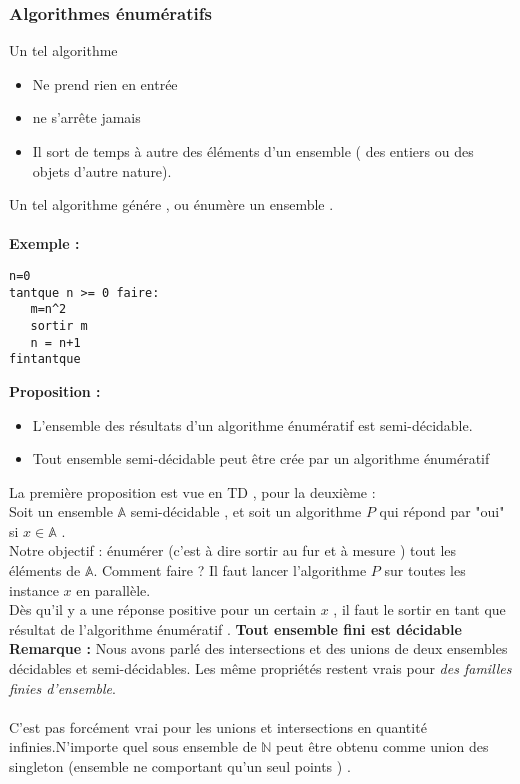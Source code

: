 \documentclass[base.tex]{subfiles}
\begin{document}
\subsubsection{Algorithmes énumératifs }%
Un tel algorithme
\begin{itemize}
\item Ne prend rien en entrée
\item ne s'arrête jamais
\item Il sort de temps à autre des éléments d'un ensemble ( des entiers ou des objets d'autre nature).
\end{itemize}
\medskip
Un tel algorithme génére , ou énumère un ensemble .
\\
\\
\textbf{Exemple :} 
\begin{verbatim}
n=0
tantque n >= 0 faire:
   m=n^2
   sortir m
   n = n+1
fintantque
\end{verbatim}
\medskip
\textbf{Proposition :}
\begin{itemize}
\item L'ensemble des résultats d'un algorithme énumératif est semi-décidable.
\item Tout ensemble semi-décidable peut être crée par un algorithme énumératif
\end{itemize}
\medskip
La première proposition est vue en TD , pour la deuxième :\\
Soit un ensemble $\mathbb{A}$ semi-décidable , et soit un algorithme $P$ qui répond par "oui" si $x \in \mathbb{A}$ .\\
Notre objectif : énumérer (c'est à dire sortir au fur et à mesure ) tout les éléments de $\mathbb{A}$. Comment faire ? Il faut lancer l'algorithme $P$ sur toutes les instance $x$ en parallèle.\\ %
Dès qu'il y a une réponse positive pour un certain $x$ , il faut le sortir en tant que résultat de l'algorithme énumératif .
\medskip
\textbf{Tout ensemble fini est décidable}
\medskip
\textbf{Remarque :} Nous avons parlé des intersections et des unions de deux ensembles décidables et semi-décidables. Les même propriétés restent vrais pour \textit{des familles finies d'ensemble}.
\\
\\
C'est pas forcément vrai pour les unions et intersections en quantité infinies.N'importe quel sous ensemble de $\mathbb{N}$ peut être obtenu comme union des singleton (ensemble ne comportant qu'un seul points ) .
\end{document}
